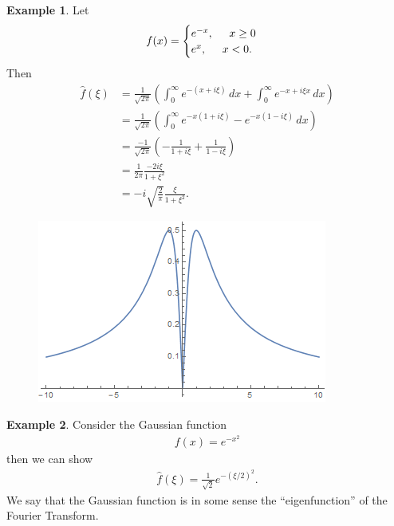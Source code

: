 \documentclass{article}
\theoremstyle{definition}
\newtheorem{exmp}{Example}[section]
\begin{document}
\begin{exmp}
 	Let 
 	\begin{align*}
 	f(x) =
 	\begin{cases}
 	e^{-x}, \hspace{0.5cm} x\geq 0\\
 	e^{x}, \hspace{0.5cm} x < 0.
 	\end{cases}
 	\end{align*}	
 	Then
 	\begin{align*}
 	\hat{f}(\xi) &= \frac{1}{\sqrt{2\pi}}\left(\int^\infty_0 e^{-(x+i\xi)}\,dx + \int^\infty_0 e^{-x + i\xi x}\,dx \right)\\
 	&= \frac{1}{\sqrt{2\pi}}\left(\int^\infty_0 e^{-x(1+i\xi)} - e^{-x(1-i\xi)}\,dx\right)\\
 	&= \frac{-1}{\sqrt{2\pi}}\left(-\frac{1}{1+i\xi} + \frac{1}{1-i\xi}\right)\\
 	&= \frac{1}{2\pi}\frac{-2i\xi}{1+\xi^2}\\
 	&= -i\sqrt{\frac{2}{\pi}}\frac{\xi}{1+\xi^2}.
 	\end{align*}
 	\begin{figure}[h!]
 		\centering
 		\includegraphics[scale=1]{fourier_2.png}
 	\end{figure}
\end{exmp}



\newpage


\begin{exmp}
	Consider the Gaussian function
	\begin{align*}
	f(x) = e^{-x^2}
	\end{align*}
	then we can show
	\begin{align*}
	\hat{f}(\xi) = \frac{1}{\sqrt{2}}e^{-(\xi/2)^2}.
	\end{align*}
	We say that the Gaussian function is in some sense the ``eigenfunction'' of the Fourier Transform.
\end{exmp}
$\,$\\
\end{document}
